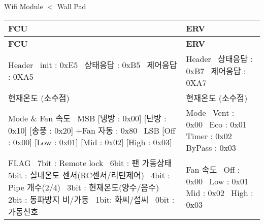 \begin{DoxyItemize}
\item Wifi Module $<$ Wall Pad \tabulinesep=1mm
\begin{longtabu} spread 0pt [c]{*{2}{|X[-1]}|}
\hline
\rowcolor{\tableheadbgcolor}\textbf{ F\+CU  }&\textbf{ E\+RV   }\\
\endfirsthead
\hline
\endfoot
\hline
\rowcolor{\tableheadbgcolor}\textbf{ F\+CU  }&\textbf{ E\+RV   }\\
\endhead
Header~\newline
 init \+: 0x\+E5~\newline
 상태응답 \+: 0x\+B5~\newline
 제어응답 \+: 0\+X\+A5  &Header~\newline
 상태응답 \+: 0x\+B7~\newline
 제어응답 \+: 0\+X\+A7   \\
현재온도 (소수점)  &현재온도 (소수점)   \\
Mode \& Fan 속도~\newline
 M\+SB \mbox{[}냉방 \+: 0x00\mbox{]} \mbox{[}난방 \+: 0x10\mbox{]} \mbox{[}송풍 \+: 0x20\mbox{]} +\+Fan 자동 \+: 0x80~\newline
 L\+SB \mbox{[}Off \+: 0x00\mbox{]} \mbox{[}Low \+: 0x01\mbox{]} \mbox{[}Mid \+: 0x02\mbox{]} \mbox{[}High \+: 0x03\mbox{]}  &Mode~\newline
 Vent \+: 0x00~\newline
 Eco \+: 0x01~\newline
 Timer \+: 0x02~\newline
 By\+Pass \+: 0x03   \\
F\+L\+AG~\newline
 7bit \+: Remote lock~\newline
 6bit \+: 팬 가동상태~\newline
 5bit \+: 실내온도 센서(R\+C센서/리턴제어)~\newline
 4bit \+: Pipe 개수(2/4)~\newline
 3bit \+: 현재온도(양수/음수)~\newline
 2bit \+: 동파방지 비/가동~\newline
 1bit\+: 화씨/섭씨~\newline
 0bit \+: 가동신호  &Fan 속도~\newline
 Off \+: 0x00~\newline
 Low \+: 0x01~\newline
 Mid \+: 0x02~\newline
 High \+: 0x03   \\

\end{longtabu}
\end{DoxyItemize}
